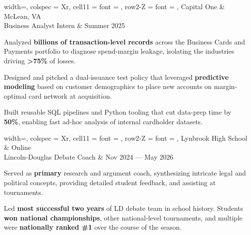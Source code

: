 \documentclass[10pt]{article}
\begin{document}
\begin{tblr}{
    width=\textwidth,
    colspec = {Xr},
    cell{1}{1} = {font = {\bfseries}},
    row{2-Z} = {font = {\itshape}},
  }
  Capital One                                          & McLean, VA  \\
  Business Analyst Intern & Summer 2025 \\
\end{tblr}
\begin{compactitem}
\item Analyzed \textbf{billions of transaction-level records} across the
    Business Cards and Payments portfolio to diagnose spend-margin
    leakage, isolating the industries driving \textbf{>75\%} of losses.

\item Designed and pitched a dual-issuance test policy that leveraged
    \textbf{predictive modeling} based on customer demographics to
    place new accounts on margin-optimal card network at acquisition.

\item Built reusable SQL pipelines and Python tooling that cut data-prep
    time by \textbf{50\%}, enabling fast ad-hoc analysis of internal
    cardholder datasets.
\end{compactitem}

\vspace{0.5em}

\begin{tblr}{
    width=\textwidth,
    colspec = {Xr},
    cell{1}{1} = {font = {\bfseries}},
    row{2-Z} = {font = {\itshape}},
  }
  Lynbrook High School         & Online               \\
  Lincoln-Douglas Debate Coach & Nov 2024 --- May 2026 \\
\end{tblr}
\begin{compactitem}
\item Served as \textbf{primary} research and argument coach,
    synthesizing intricate legal and political concepts, providing
    detailed student feedback, and assisting at tournaments.

\item
    Led \textbf{most successful two years} of LD debate team in school
    history. Students \textbf{won national championships}, other
    national-level tournaments, and multiple were \textbf{nationally
    ranked \#1} over the
    course of the season.
\end{compactitem}
\end{document}
